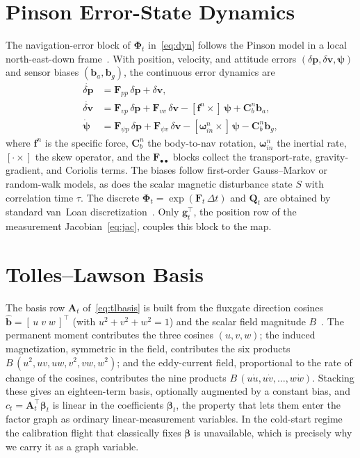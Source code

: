 \documentclass{IEEEtaes}
\begin{document}
\section{Pinson Error-State Dynamics}\label{app:pinson}
The navigation-error block of $\boldsymbol{\Phi}_t$ in~\eqref{eq:dyn} follows the
Pinson model in a local north-east-down frame~\cite{titterton2004,groves2013}. With
position, velocity, and attitude errors $(\delta\mathbf{p},\delta\mathbf{v},
\boldsymbol{\psi})$ and sensor biases $(\mathbf{b}_a,\mathbf{b}_g)$, the continuous
error dynamics are
\begin{equation}
\begin{aligned}
\dot{\delta\mathbf{p}}&=\mathbf{F}_{pp}\,\delta\mathbf{p}+\delta\mathbf{v},\\
\dot{\delta\mathbf{v}}&=\mathbf{F}_{vp}\,\delta\mathbf{p}
+\mathbf{F}_{vv}\,\delta\mathbf{v}
-[\mathbf{f}^n\times]\,\boldsymbol{\psi}+\mathbf{C}^n_b\mathbf{b}_a,\\
\dot{\boldsymbol{\psi}}&=\mathbf{F}_{\psi p}\,\delta\mathbf{p}
+\mathbf{F}_{\psi v}\,\delta\mathbf{v}
-[\boldsymbol{\omega}^n_{in}\times]\,\boldsymbol{\psi}-\mathbf{C}^n_b\mathbf{b}_g,
\end{aligned}
\label{eq:pinson}
\end{equation}
where $\mathbf{f}^n$ is the specific force, $\mathbf{C}^n_b$ the body-to-nav rotation,
$\boldsymbol{\omega}^n_{in}$ the inertial rate, $[\cdot\times]$ the skew operator, and
the $\mathbf{F}_{\bullet\bullet}$ blocks collect the transport-rate, gravity-gradient,
and Coriolis terms. The biases follow first-order Gauss--Markov or random-walk models,
as does the scalar magnetic disturbance state $S$ with correlation time $\tau$. The
discrete $\boldsymbol{\Phi}_t=\exp(\mathbf{F}_t\,\Delta t)$ and $\mathbf{Q}_t$ are
obtained by standard van~Loan discretization~\cite{farrell2008}. Only
$\mathbf{g}_t^{\top}$, the position row of the measurement Jacobian~\eqref{eq:jac},
couples this block to the map.

\section{Tolles--Lawson Basis}\label{app:tl}
The basis row $\mathbf{A}_t$ of~\eqref{eq:tlbasis} is built from the fluxgate
direction cosines $\hat{\mathbf{b}}=[\,u\;v\;w\,]^{\top}$ (with $u^2+v^2+w^2=1$) and
the scalar field magnitude $B$~\cite{tolles1950,leliak1961}. The permanent moment
contributes the three cosines $(u,v,w)$; the induced magnetization, symmetric in the
field, contributes the six products
$B\,(u^2,uv,uw,v^2,vw,w^2)$; and the eddy-current field, proportional to the rate of
change of the cosines, contributes the nine products $B\,(u\dot u,u\dot v,\dots,
w\dot w)$. Stacking these gives an eighteen-term basis, optionally augmented by a
constant bias, and $c_t=\mathbf{A}_t^{\top}\boldsymbol{\beta}_t$ is linear in the
coefficients $\boldsymbol{\beta}_t$, the property that lets them enter the factor
graph as ordinary linear-measurement variables. In the cold-start regime the
calibration flight that classically fixes $\boldsymbol{\beta}$ is unavailable, which
is precisely why we carry it as a graph variable.
\end{document}
